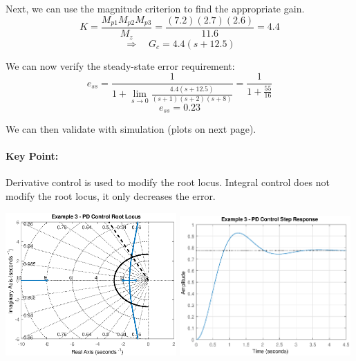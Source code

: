 \documentclass{book}
\begin{document}
Next, we can use the magnitude criterion to find the appropriate gain.
\[ K = \frac{M_{p1}M_{p2}M_{p3}}{M_{z}}=\frac{(7.2)(2.7)(2.6)}{11.6} = 4.4 \]
\[ \Rightarrow\quad G_c = 4.4(s+12.5) \]

We can now verify the steady-state error requirement:
\[ e_{ss} = \frac{1}{1+\lim_{s\to0}\frac{4.4(s+12.5)}{(s+1)(s+2)(s+8)}} = \frac{1}{1+\frac{55}{16}} \]
\[ e_{ss} = 0.23 \]

We can then validate with simulation (plots on next page).

\paragraph*{Key Point:} Derivative control is used to modify the root locus. Integral control does not modify the root locus, it only decreases the error.

\begin{center}
	\includegraphics[width=0.49\textwidth,trim={1cm 0 1cm 0},clip]{Lecture12Example3PD.eps}
	\hfill
	\includegraphics[width=0.49\textwidth,trim={1cm 0 1cm 0},clip]{Lecture12Example3PDStep.eps}
\end{center}
\end{document}
